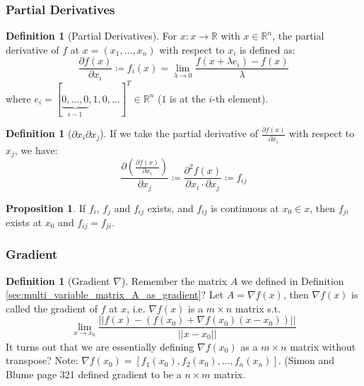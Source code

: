 \documentclass[12pt]{article}
\newcommand{\R}{{\mathbb R}}
\theoremstyle{definition}
\newtheorem{definition}[theorem]{Definition}
\newtheorem{proposition}[theorem]{Proposition}
\theoremstyle{plain}
\begin{document}
\subsubsection{Partial Derivatives }
\begin{definition}
    [Partial Derivatives] For $x : x \to \R$ with $x \in\R^n$, the partial
    derivative of $f$ at $x = (x_1, \ldots, x_n)$ with respect to $x_i$ is defined as:
    \[
        \frac{\partial f(x)}{\partial x_i} \coloneqq f_i(x) = \lim_{\lambda \to
        0} \frac{f(x + \lambda e_i)  - f(x)}{\lambda}
    \]
    where $e_i = [\underbrace{0,\ldots, 0}_{i-1}, 1, 0,\ldots]^T \in \R^n$ ($1$ is at the $i$-th
    element).
\end{definition}

\begin{definition}
    [$\partial x_i \partial x_j$]
If we take the partial derivative of $\frac{\partial f(x)}{\partial x_i}$ with
respect to $x_j$, we have:
\[
\frac{\partial \left( \frac{\partial f(x)}{\partial x_i} \right)}{\partial x_j}
\coloneqq \frac{\partial^2 f(x)}{ \partial x_i \cdot \partial x_j} \coloneqq
f_{ij}
\]
\end{definition}

\begin{proposition}
If $f_i$, $f_j$ and $f_{ij}$ exists, and $f_{ij}$ is continuous at $x_0 \in x$,
then $f_{ji}$ exists at $x_0$ and $f_{ij} = f_{ji}$.
\end{proposition}

\subsubsection{Gradient}
\begin{definition}
    [Gradient $\nabla$]
    Remember the matrix $A$ we defined in Definition
    \ref{sec:multi_variable_matrix_A_as_gradient}? Let $A = \nabla f(x)$, then
    $\nabla f(x)$ is called the gradient of $f$ at $x$, i.e. $\nabla f(x)$ is a
    $m\times n$ matrix s.t.
    \[
        \lim_{x \to x_0} \frac{||f(x) -\left( f(x_0) + \nabla f(x_0)(x - x_0)
        \right)||}{||x - x_0||}
    \]
    It turns out that we are essentially defining $\nabla f(x_0)$ as a $m \times n$ matrix without
    transpose? Note: $\nabla f(x_0) = [f_1(x_0), f_2(x_0), \ldots,
    f_n(x_n)]$. (Simon and Blume page 321 defined gradient to be a $n \times m$
    matrix.
\end{definition}
\end{document}
